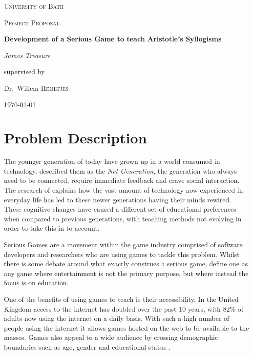 \documentclass[12pt,a4paper]{report}
\begin{document}
\begin{titlepage}
	\centering
	{\scshape\LARGE University of Bath \par}
	\vspace{1cm}
	{\scshape\Large Project Proposal\par}
	\vspace{1.5cm}
	{\huge\bfseries Development of a Serious Game to teach Aristotle's Syllogisms\par}
	\vspace{2cm}
	{\Large\itshape James Treasure\par}
	\vfill
	supervised by\par
	Dr.~Willem \textsc{Heijltjes}
	\vfill
	{\large \today\par}
\end{titlepage}

\tableofcontents
\chapter{Problem Description}
The younger generation of today have grown up in a world consumed in technology. \cite{oblinger2005educating} described them as the \textit{Net Generation}, the generation who always need to be connected, require immediate feedback and crave social interaction. The research of \cite{prensky2001games} explains how the vast amount of technology now experienced in everyday life has led to these newer generations having their minds rewired. These cognitive changes have caused a different set of educational preferences when compared to previous generations, with teaching methods not evolving in order to take this in to account.

Serious Games are a movement within the game industry comprised of software developers and researchers who are using games to tackle this problem. Whilst there is some debate around what exactly construes a serious game, \cite{michael2005serious} define one as any game where entertainment is not the primary purpose, but where instead the focus is on education. 

One of the benefits of using games to teach is their accessibility. In the United Kingdom  access to the internet has doubled over the past 10 years, with 82\% of adults now using the internet on a daily basis\citep{onssurvey}. With such a high number of people using the internet it allows games hosted on the web to be available to the masses. Games also appeal to a wide audience by crossing demographic boundaries such as age, gender and educational status \citep{griffiths2002educational}. 
\end{document}
